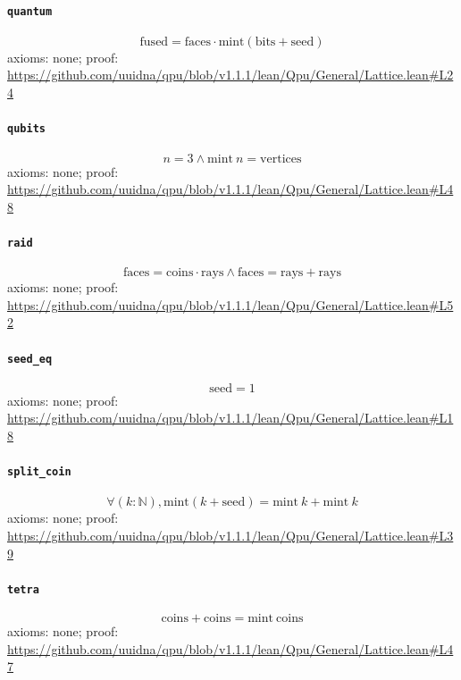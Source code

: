 \documentclass[11pt]{article}
\begin{document}
\paragraph{\texttt{quantum}}
\[ \mathrm{fused} = \mathrm{faces} \cdot \mathrm{mint} (\mathrm{bits} + \mathrm{seed}) \]
\noindent axioms: none; proof: \url{https://github.com/uuidna/qpu/blob/v1.1.1/lean/Qpu/General/Lattice.lean\#L24}

\paragraph{\texttt{qubits}}
\[ n = 3 \land \mathrm{mint}\ n = \mathrm{vertices} \]
\noindent axioms: none; proof: \url{https://github.com/uuidna/qpu/blob/v1.1.1/lean/Qpu/General/Lattice.lean\#L48}

\paragraph{\texttt{raid}}
\[ \mathrm{faces} = \mathrm{coins} \cdot \mathrm{rays} \land \mathrm{faces} = \mathrm{rays} + \mathrm{rays} \]
\noindent axioms: none; proof: \url{https://github.com/uuidna/qpu/blob/v1.1.1/lean/Qpu/General/Lattice.lean\#L52}

\paragraph{\texttt{seed\_eq}}
\[ \mathrm{seed} = 1 \]
\noindent axioms: none; proof: \url{https://github.com/uuidna/qpu/blob/v1.1.1/lean/Qpu/General/Lattice.lean\#L18}

\paragraph{\texttt{split\_coin}}
\[ \forall (k : \mathbb{N}), \mathrm{mint} (k + \mathrm{seed}) = \mathrm{mint}\ k + \mathrm{mint}\ k \]
\noindent axioms: none; proof: \url{https://github.com/uuidna/qpu/blob/v1.1.1/lean/Qpu/General/Lattice.lean\#L39}

\paragraph{\texttt{tetra}}
\[ \mathrm{coins} + \mathrm{coins} = \mathrm{mint}\ \mathrm{coins} \]
\noindent axioms: none; proof: \url{https://github.com/uuidna/qpu/blob/v1.1.1/lean/Qpu/General/Lattice.lean\#L47}
\end{document}
